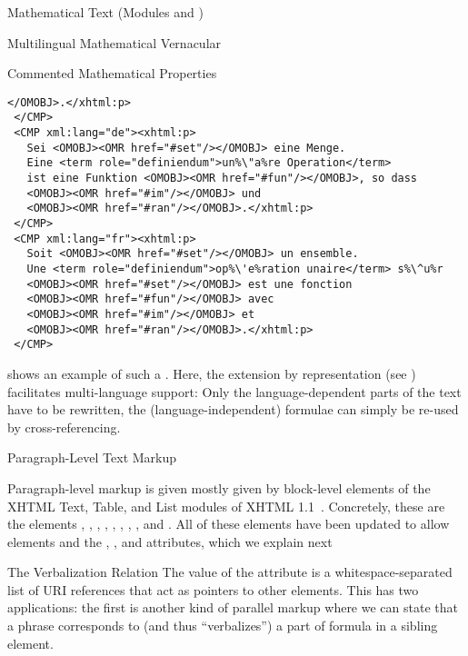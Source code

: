 \begin{tchapter}[id=mtxt,short=Mathematical Text]{Mathematical Text (Modules
   and )}
\begin{tsection}[id=mtext]{Multilingual Mathematical Vernacular}
\begin{tsubsection}{Commented Mathematical Properties}
\begin{lstlisting}[escapechar=\%,label=lst:multiling,mathescape,
  caption={A Multilingual Group of \element{CMP} Elements},
  index={trl,xml:lang,CMP,FMP,OMOBJ}]
   </OMOBJ>.</xhtml:p>
 </CMP>
 <CMP xml:lang="de"><xhtml:p>
   Sei <OMOBJ><OMR href="#set"/></OMOBJ> eine Menge. 
   Eine <term role="definiendum">un%\"a%re Operation</term> 
   ist eine Funktion <OMOBJ><OMR href="#fun"/></OMOBJ>, so dass
   <OMOBJ><OMR href="#im"/></OMOBJ> und 
   <OMOBJ><OMR href="#ran"/></OMOBJ>.</xhtml:p>
 </CMP>
 <CMP xml:lang="fr"><xhtml:p>
   Soit <OMOBJ><OMR href="#set"/></OMOBJ> un ensemble. 
   Une <term role="definiendum">op%\'e%ration unaire</term> s%\^u%r
   <OMOBJ><OMR href="#set"/></OMOBJ> est une fonction 
   <OMOBJ><OMR href="#fun"/></OMOBJ> avec 
   <OMOBJ><OMR href="#im"/></OMOBJ> et 
   <OMOBJ><OMR href="#ran"/></OMOBJ>.</xhtml:p>
 </CMP>
\end{lstlisting}

 shows an example of such a . Here,
the {\openmath} extension by {}
representation (see ) facilitates multi-language support: Only the
language-dependent parts of the text have to be rewritten, the (language-independent)
formulae can simply be re-used by cross-referencing.
\end{tsubsection}

\begin{tsubsection}[id=rt]{Paragraph-Level Text Markup}

  Paragraph-level markup is given mostly given by block-level elements of the XHTML Text,
  Table, and List modules of XHTML 1.1~\cite{McCarron:xhtmlmods1.1}. Concretely, these are
  the elements , , , ,
  , , , , and . All of
  these elements have been updated to allow  elements and the
  , , and 
  attributes, which we explain next
\end{tsubsection}

\begin{tsubsection}{The Verbalization Relation}
  The value of the  attribute is a whitespace-separated list of
  URI references that act as pointers to other \omdoc elements. This has two
  applications: the first is another kind of parallel markup where we can state that a
  phrase corresponds to (and thus ``verbalizes'') a part of formula in a sibling
   element.


\end{tsubsection}
\end{tsection}
\end{tchapter}
